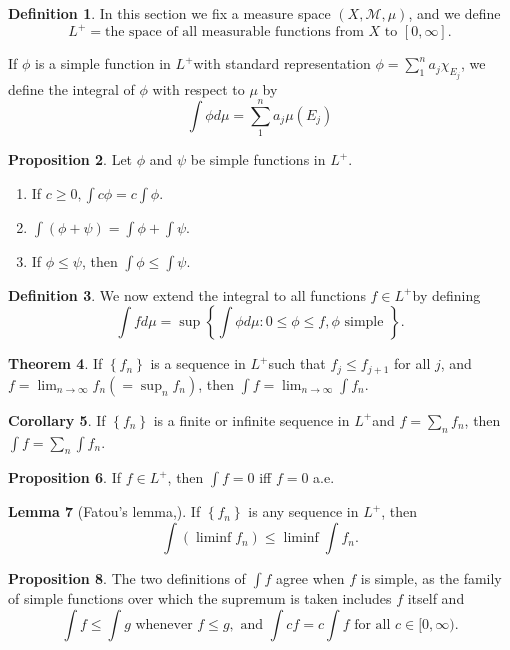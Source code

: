 \documentclass[12pt,a4paper]{book}
\newenvironment{enu}{\begin{enumerate}[(1)]}{\end{enumerate}}
\theoremstyle{definition}
\newtheorem{defn}{Definition}[section]
\newtheorem{coro}[defn]{Corollary}
\newtheorem{theo}[defn]{Theorem}
\newtheorem{lem}[defn]{Lemma}
\newtheorem{prop}[defn]{Proposition}
\begin{document}
\begin{defn}
    In this section we fix a measure space $(X, \mathcal{M}, \mu)$, and we define
    $$
        L^{+}=\text {the space of all measurable functions from } X \text { to }[0, \infty] .
    $$

    If $\phi$ is a simple function in $L^{+}$with standard representation $\phi=\sum_1^n a_j \chi_{E_j}$, we define the integral of $\phi$ with respect to $\mu$ by
    $$
        \int \phi d \mu=\sum_1^n a_j \mu\left(E_j\right)
    $$
\end{defn}
\begin{prop}
    Let $\phi$ and $\psi$ be simple functions in $L^{+}$.
    \begin{enu}
        \item If $c \geq 0, \int c \phi=c \int \phi$.
        \item $\int(\phi+\psi)=\int \phi+\int \psi$.
        \item If $\phi \leq \psi$, then $\int \phi \leq \int \psi$.
    \end{enu}
\end{prop}
\begin{defn}
    We now extend the integral to all functions $f \in L^{+}$by defining
    $$
        \int f d \mu=\sup \left\{\int \phi d \mu: 0 \leq \phi \leq f, \phi \text { simple }\right\} .
    $$
\end{defn}
\begin{theo}
    If $\left\{f_n\right\}$ is a sequence in $L^{+}$such that $f_j \leq f_{j+1}$ for all $j$, and $f=\lim _{n \rightarrow \infty} f_n\left(=\sup _n f_n\right)$, then $\int f=\lim _{n \rightarrow \infty} \int f_n$.
\end{theo}
\begin{coro}
    If $\left\{f_n\right\}$ is a finite or infinite sequence in $L^{+}$and $f=\sum_n f_n$, then $\int f=\sum_n \int f_n$.
\end{coro}
\begin{prop}
    If $f \in L^{+}$, then $\int f=0$ iff $f=0$ a.e.
\end{prop}
\begin{lem}[Fatou's lemma,]
    If $\left\{f_n\right\}$ is any sequence in $L^{+}$, then
    $$
        \int\left(\liminf f_n\right) \leq \liminf \int f_n .
    $$
\end{lem}
\begin{prop}
    The two definitions of $\int f$ agree when $f$ is simple, as the family of simple functions over which the supremum is taken includes $f$ itself and
    $$
        \int f \leq \int g \text { whenever } f \leq g, \text { and } \int c f=c \int f \text { for all } c \in[0, \infty) .
    $$
\end{prop}
\end{document}
